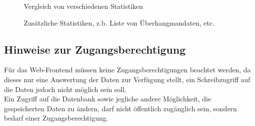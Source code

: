 \documentclass[11pt,a4paper]{scrartcl}
\begin{document}
\begin{figure}[h!]
    \begin{center}
    \end{center}
    \caption{Vergleich von verschiedenen Statistiken}
    \label{fig:gui-vergleich}
\end{figure}
\begin{figure}[h!]
    \begin{center}
    \end{center}
    \caption{Zusätzliche Statistiken, z.b. Liste von Überhangmandaten, etc.}
    \label{fig:gui-zusatzstatistiken}
\end{figure}
\subsection{Hinweise zur Zugangsberechtigung}
Für das Web-Frontend müssen keine Zugangsberechtigungen beachtet werden, da
dieses nur eine Auswertung der Daten zur Verfügung stellt, ein Schreibzugriff
auf die Daten jedoch nicht möglich sein soll.\\
Ein Zugriff auf die Datenbank sowie jegliche andere Möglichkeit, die
gespeicherten Daten zu ändern, darf nicht öffentlich zugänglich sein, sondern
bedarf einer Zugangsberechtigung.
\newpage
\end{document}
